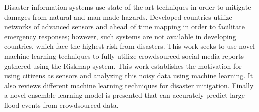 % 
% 
%

Disaster information systems use state of the art techniques in order 
to mitigate damages from natural and man made hazards. 
Developed countries utilize networks of advanced sensors and 
ahead of time mapping in order to facilitate emergency responses; 
however, such systems are not available in developing countries, which face 
the highest risk from disasters. This work seeks to use novel machine learning 
techniques to fully utilize crowdsourced social media reports gathered 
using the Riskmap system. This work establishes the motivation for using 
citizens as sensors and analyzing this noisy data using machine learning. It also 
reviews different machine learning techniques for disaster mitigation. Finally 
a novel ensemble learning model is presented that can accurately predict large 
flood events from crowdsourced data.